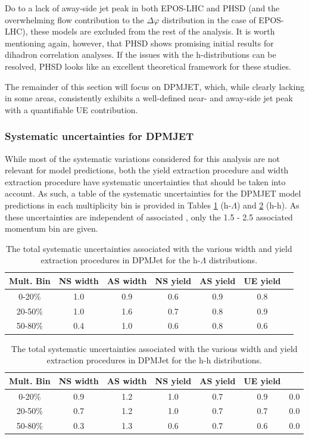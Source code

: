 Do to a lack of away-side jet peak in both EPOS-LHC and PHSD (and the overwhelming flow contribution to the $\Delta\varphi$ distribution in the case of EPOS-LHC), these models are excluded from the rest of the analysis. It is worth mentioning again, however, that PHSD shows promising initial results for dihadron correlation analyses. If the issues with the h-\lmb distributions can be resolved, PHSD looks like an excellent theoretical framework for these studies. 

The remainder of this section will focus on DPMJET, which, while clearly lacking in some areas, consistently exhibits a well-defined near- and away-side jet peak with a quantifiable UE contribution.

\subsubsection{Systematic uncertainties for DPMJET}
\label{sec:dpmjet_systematics}
While most of the systematic variations considered for this analysis are not relevant for model predictions, both the yield extraction procedure and width extraction procedure have systematic uncertainties that should be taken into account. As such, a table of the systematic uncertainties for the DPMJET model predictions in each multiplicity bin is provided in Tables \ref{dpmjet_systematics_table_lambda} (h-$\Lambda$) and \ref{dpmjet_systematics_table_h} (h-h). As these uncertainties are independent of associated \pt, only the 1.5 - 2.5 \GeVc associated momentum bin are given. 

\begin{table}[ht]
\centering
\begin{tabular}{|c||c|c|c|c|c|c|}
\hline
Mult. Bin & NS width & AS width & NS yield & AS yield & UE yield  \\
\hline
0-20\% &  1.0 & 0.9 & 0.6 & 0.9 & 0.8  \\
20-50\% &  1.0 & 1.6 & 0.7 & 0.8 & 0.9  \\
50-80\% &  0.4 & 1.0 & 0.6 & 0.8 & 0.6  \\
\hline
\end{tabular}
\caption{The total systematic uncertainties associated with the various width and yield extraction procedures in DPMJet for the h-$\Lambda$ distributions.}
\label{dpmjet_systematics_table_lambda}
\end{table}

\begin{table}[ht]
\centering
\begin{tabular}{|c||c|c|c|c|c|c|}
\hline
Mult. Bin & NS width & AS width & NS yield & AS yield & UE yield \\
\hline
0-20\% &  0.9 & 1.2 & 1.0 & 0.7 & 0.9 & 0.0 \\
20-50\% &  0.7 & 1.2 & 1.0 & 0.7 & 0.7 & 0.0 \\
50-80\% &  0.3 & 1.3 & 0.6 & 0.7 & 0.6 & 0.0 \\
\hline
\end{tabular}
\caption{The total systematic uncertainties associated with the various width and yield extraction procedures in DPMJet for the h-h distributions.}
\label{dpmjet_systematics_table_h}
\end{table}

